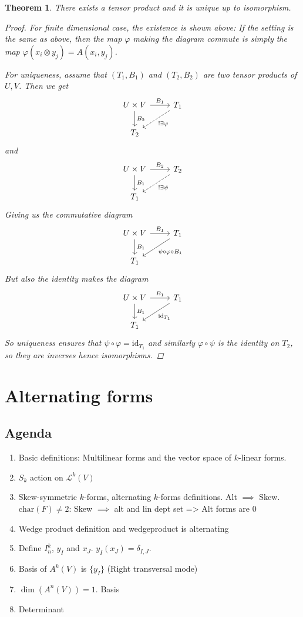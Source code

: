 \documentclass[10pt,twoside,openany,final]{memoir}
\theoremstyle{break}
\newtheorem{theorem}[section]{Theorem}
\theoremstyle{Break}
\begin{document}
\begin{theorem}
	There exists a tensor product and it is unique up to isomorphism.
	\begin{proof}
		For finite dimensional case, the existence is shown above: If the setting is the same as above, then the map $\varphi$ making the diagram commute is simply the map $\varphi(x_i \otimes y_j)=A(x_i,y_j)$.

		For uniqueness, assume that $(T_1,B_1)$ and $(T_2,B_2)$ are two tensor products of $U,V$. Then we get
	\[
\begin{tikzcd}
	U \times V \ar[r,"B_1"] \ar[d,"B_2"] & T_1 \ar[ld,dashed,"!\exists \varphi"]\\
	 T_2 &
\end{tikzcd}
	\]
	and
	\[
\begin{tikzcd}
	U \times V \ar[r,"B_2"] \ar[d,"B_1"] & T_2 \ar[ld,dashed,"!\exists \psi"]\\
	 T_1 &
\end{tikzcd}
	\]
	Giving us the commutative diagram
	\[
\begin{tikzcd}
	U \times V \ar[r," B_1"] \ar[d,"B_1"] & T_1 \ar[ld,"\psi \circ \varphi \circ B_1 "]\\
	 T_1 &
\end{tikzcd}
	\]
	But also the identity makes the diagram
	\[
\begin{tikzcd}
	U \times V \ar[r,"B_1"] \ar[d, "B_1"] & T_1 \ar[ld, "\textrm{id}_{T_1}"]\\
	T_1&
\end{tikzcd}
	\]
	So uniqueness ensures that $\psi \circ \varphi= \textrm{id}_{T_1}$ and similarly $\varphi \circ \psi$ is the identity on $T_2$, so they are inverses hence isomorphisms.
	\end{proof}
\end{theorem}


\chapter{Alternating forms}
\section*{Agenda}
\begin{enumerate}
	\item Basic definitions: Multilinear forms and the vector space of $k$-linear forms. 
	\item $S_k$ action on $\mathcal{L}^k(V)$
	\item Skew-symmetric $k$-forms, alternating $k$-forms definitions. Alt $\implies$ Skew. $\textrm{char}(F)\neq 2$: Skew $\implies$ alt and lin dept set => Alt forms are $0$
	\item Wedge product definition and wedgeproduct is alternating
	\item Define $I_n^k$, $y_I$ and $x_J$. $y_I(x_J)=\delta_{I,J}$.
	\item Basis of $A^k(V)$ is $\{y_I\}$ (Right transversal mode)
	\item $\dim(A^n(V))=1$. Basis
	\item Determinant
\end{enumerate}
\end{document}
